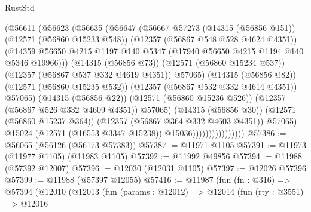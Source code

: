 \begin{lexlean}{RustStd}
\begin{coremodule}
                                    (@56611
                                      (@56623
                                        (@56635
                                          (@56647
                                            (@56667
                                              @57273
                                              (@14315 (@56856 @151))
                                              (@12571 (@56860 @15233 @548))
                                              (@12357 (@56867 @548 @528 @4624 @4351))
                                              (@14359
                                                @56650
                                                @4215
                                                @1197
                                                @140
                                                @5347
                                                (@17940 @56650 @4215 @1194 @140 @5346 @19966)))
                                            (@14315 (@56856 @73))
                                            (@12571 (@56860 @15234 @537))
                                            (@12357 (@56867 @537 @332 @4619 @4351))
                                            @57065)
                                          (@14315 (@56856 @82))
                                          (@12571 (@56860 @15235 @532))
                                          (@12357 (@56867 @532 @332 @4614 @4351))
                                          @57065)
                                        (@14315 (@56856 @22))
                                        (@12571 (@56860 @15236 @526))
                                        (@12357 (@56867 @526 @332 @4609 @4351))
                                        @57065)
                                      (@14315 (@56856 @30))
                                      (@12571 (@56860 @15237 @364))
                                      (@12357 (@56867 @364 @332 @4603 @4351))
                                      @57065)
                                    @15024
                                    (@12571 (@16553 @3347 @15238))
                                    @15036))))))))))))))))
@57386 := @56065 (@56126 (@56173 @57383))
@57387 := @11971 @1105
@57391 := @11973 (@11977 @1105) (@11983 @1105)
@57392 := @11992 @49856
@57394 := @11988 (@57392 @12007)
@57396 := @12030 (@12031 @1105)
@57397 := @12026 @57396
@57399 := @11988 (@57397 @12055)
@57416 := @11987
    (fun (fn : @316) =>
    @57394
      (@12010
        (@12013
          (fun (params : @12012) =>
          @12014
            (fun (rty : @3551) =>
            @12016

\end{coremodule}
\end{lexlean}
